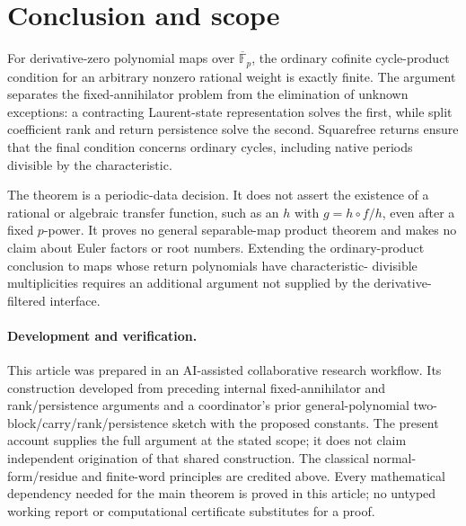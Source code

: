 \section{Conclusion and scope}

For derivative-zero polynomial maps over $\overline{\mathbb F}_p$,
the ordinary cofinite cycle-product condition for an arbitrary
nonzero rational weight is exactly finite. The argument separates
the fixed-annihilator problem from the elimination of unknown
exceptions: a contracting Laurent-state representation solves the
first, while split coefficient rank and return persistence solve
the second. Squarefree returns ensure that the final condition
concerns ordinary cycles, including native periods divisible by
the characteristic.

The theorem is a periodic-data decision. It does not assert the
existence of a rational or algebraic transfer function, such as an
$h$ with $g=h\circ f/h$, even after a fixed $p$-power. It proves
no general separable-map product theorem and makes no claim about
Euler factors or root numbers. Extending the ordinary-product
conclusion to maps whose return polynomials have characteristic-
divisible multiplicities requires an additional argument not
supplied by the derivative-filtered interface.

\paragraph{Development and verification.}
This article was prepared in an AI-assisted collaborative research
workflow. Its construction developed from preceding internal
fixed-annihilator and rank/persistence arguments and a coordinator's
prior general-polynomial two-block/carry/rank/persistence sketch
with the proposed constants. The present account supplies the full
argument at the stated scope; it does not claim independent
origination of that shared construction. The classical
normal-form/residue and finite-word principles are credited above.
Every mathematical dependency needed for the main theorem is
proved in this article; no untyped working report or computational
certificate substitutes for a proof.
